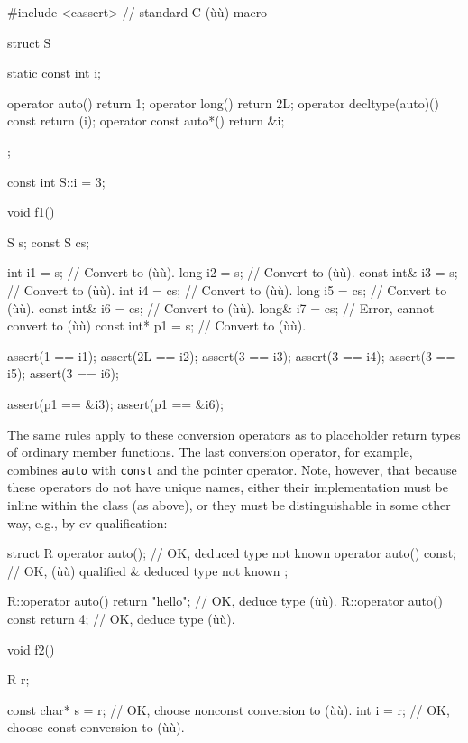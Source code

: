 \begin{emcppslisting}[emcppsstandards={c++14}]
#include <cassert>  // standard C (ù{}ù) macro

struct S
{
    static const int i;

    operator auto() { return 1; }
    operator long() { return 2L; }
    operator decltype(auto)() const { return (i); }
    operator const auto*() { return &i; }
};

const int S::i = 3;

void f1()
{
    S       s{};
    const S cs{};

    int         i1 = s;   // Convert to (ù{}ù).
    long        i2 = s;   // Convert to (ù{}ù).
    const int&  i3 = s;   // Convert to (ù{}ù).
    int         i4 = cs;  // Convert to (ù{}ù).
    long        i5 = cs;  // Convert to (ù{}ù).
    const int&  i6 = cs;  // Convert to (ù{}ù).
    long&       i7 = cs;  // Error, cannot convert to (ù{}ù)
    const int*  p1 = s;   // Convert to (ù{}ù).

    assert(1  == i1);
    assert(2L == i2);
    assert(3  == i3);
    assert(3  == i4);
    assert(3  == i5);
    assert(3  == i6);

    assert(p1 == &i3);
    assert(p1 == &i6);
}
\end{emcppslisting}
    

\noindent The same rules apply to these conversion operators as to placeholder
return types of ordinary member functions. The last conversion operator,
for example, combines \lstinline!auto! with \lstinline!const! and the pointer
operator. Note, however, that because these operators do not have unique
names, either their implementation must be inline within the class (as
above), or they must be distinguishable in some other way, e.g., by
cv-qualification:

\begin{emcppslisting}[emcppsstandards={c++14}]
struct R
{
    operator auto();        // OK, deduced type not known
    operator auto() const;  // OK, (ù{}ù) qualified & deduced type not known
};

R::operator auto() { return "hello"; }  // OK, deduce type (ù{}ù).
R::operator auto() const { return 4; }  // OK, deduce type (ù{}ù).

void f2()
{
    R r;

    const char* s = r;  // OK, choose nonconst conversion to (ù{}ù).
    int         i = r;  // OK, choose const conversion to (ù{}ù).
}
\end{emcppslisting}
    


